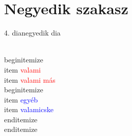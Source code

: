 \documentclass[aspectratio=169,12pt,fragile,allowframebreaks]{beamer}
\begin{document}
\section{Negyedik szakasz}
\begin{frame}{4. dia}{negyedik dia}
\begin{semiverbatim}
\\begin{itemize}
\\item \textcolor{red}{valami}
\\item \textcolor{red}{valami más}
\\begin{itemize}
\\item \textcolor{blue}{egyéb}
\\item \textcolor{blue}{valamicske}
\\end{itemize}
\\end{itemize}
\end{semiverbatim}
\end{frame}
\end{document}
